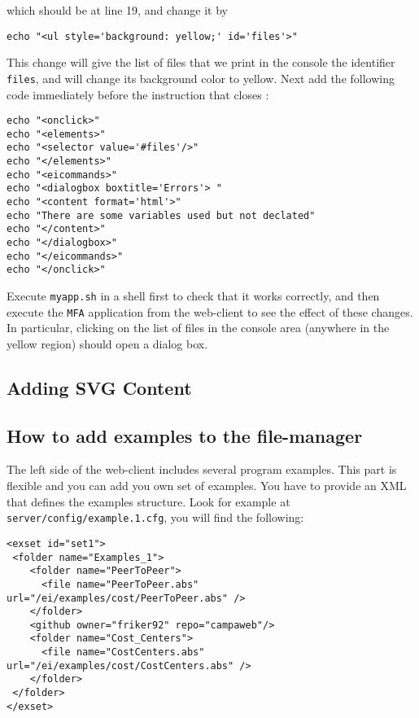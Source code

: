 \medskip
\noindent
which should be at line 19, and change it by

\medskip
\begin{lstlisting}[style=script]
echo "<ul style='background: yellow;' id='files'>"
\end{lstlisting}

\medskip
\noindent
This change will give the list of files that we print in the console
the identifier \texttt{files}, and will change its background color to
yellow. Next add the following code immediately before the instruction
that closes :

\medskip
\begin{lstlisting}[style=script]
echo "<onclick>"
echo "<elements>"
echo "<selector value='#files'/>"
echo "</elements>"
echo "<eicommands>"
echo "<dialogbox boxtitle='Errors'> "
echo "<content format='html'>"
echo "There are some variables used but not declated"
echo "</content>"
echo "</dialogbox>"
echo "</eicommands>"
echo "</onclick>"
\end{lstlisting}

\medskip
\noindent
Execute \texttt{myapp.sh} in a shell first to check that it works
correctly, and then execute the \texttt{MFA} application from the
web-client to see the effect of these changes. In particular, clicking
on the list of files in the console area (anywhere in the yellow
region) should open a dialog box.

\subsection{Adding SVG Content}

\subsection{How to add examples to the file-manager}

The left side of the web-client includes several program
examples. This part is flexible and you can add you own set of
examples. You have to provide an XML that defines the examples
structure. Look for example at \texttt{server/config/example.1.cfg},
you will find the following:

\medskip
\begin{lstlisting}
<exset id="set1">
 <folder name="Examples_1">
    <folder name="PeerToPeer">
      <file name="PeerToPeer.abs" url="/ei/examples/cost/PeerToPeer.abs" />
    </folder>
    <github owner="friker92" repo="campaweb"/>
    <folder name="Cost_Centers">
      <file name="CostCenters.abs" url="/ei/examples/cost/CostCenters.abs" />
    </folder>
 </folder>
</exset>
\end{lstlisting}

